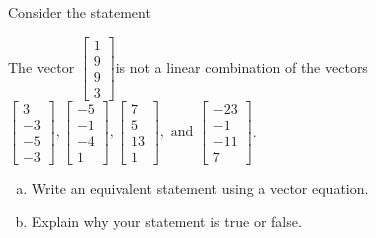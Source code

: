 
\begin{exerciseStatement}


Consider the statement 
\begin{center}\begin{minipage}{0.8\textwidth}
 The vector \( \left[\begin{array}{c}
1 \\
9 \\
9 \\
3
\end{array}\right] \)is not a linear combination of the vectors \( \left[\begin{array}{c}
3 \\
-3 \\
-5 \\
-3
\end{array}\right] , \left[\begin{array}{c}
-5 \\
-1 \\
-4 \\
1
\end{array}\right] , \left[\begin{array}{c}
7 \\
5 \\
13 \\
1
\end{array}\right] , \text{ and } \left[\begin{array}{c}
-23 \\
-1 \\
-11 \\
7
\end{array}\right] \). 
\end{minipage}\end{center}
    


\begin{enumerate}[(a)]
\item  Write an equivalent statement using a vector equation.
\item  Explain why your statement is true or false.
\end{enumerate}
    
\end{exerciseStatement}
    

